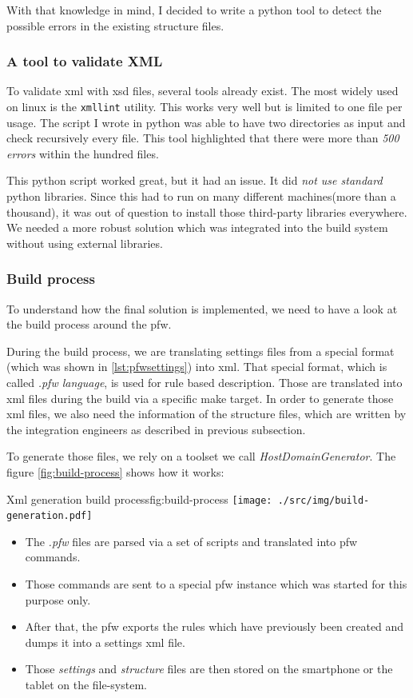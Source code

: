 With that knowledge in mind, I decided to write a \gls{python} tool to detect the possible errors in the existing structure files.

\subsubsection{A tool to validate XML}
To validate \gls{xml} with \gls{xsd} files, several tools already exist. The most widely used on linux is the \lstinline{xmllint} utility.
This works very well but is limited to one file per usage. The script I wrote in \gls{python} was able to have two directories as input and check
recursively every file.
This tool highlighted that there were more than \emph{500 errors} within the hundred files.

This \gls{python} script worked great, but it had an issue. It did \emph{not use standard} \gls{python} libraries.
Since this had to run on many different machines(more than a thousand), it was out of question to install those third-party libraries everywhere.
We needed a more robust solution which was integrated into the build system without using external libraries.

\subsubsection{Build process}
To understand how the final solution is implemented, we need to have a look at the build process around the \gls{pfw}.

During the build process, we are translating settings files from a special format (which was shown in \ref{lst:pfwsettings}) into \gls{xml}.
That special format, which is called \emph{.pfw language}, is used for rule based
description. Those are translated into \gls{xml} files during the build via a
specific make target.  In order to generate those \gls{xml} files, we also need
the information of the structure files, which are written by the integration
engineers as described in previous subsection.

To generate those files, we rely on a toolset we call \emph{HostDomainGenerator}.
The figure \ref{fig:build-process} shows how it works:

\begin{figureGraphics}{Xml generation build process}{fig:build-process}
    \texttt{[image: ./src/img/build-generation.pdf]}
\end{figureGraphics}

\begin{itemize}
    \item The \emph{.pfw} files are parsed via a set of scripts and translated into \gls{pfw} commands.
    \item Those commands are sent to a special \gls{pfw} instance which was started for this purpose only.
    \item After that, the \gls{pfw} exports the rules which have previously been created and dumps it into a settings \gls{xml} file.
    \item Those \emph{settings} and \emph{structure} files are then stored on the smartphone or the tablet on the file-system.
\end{itemize}

